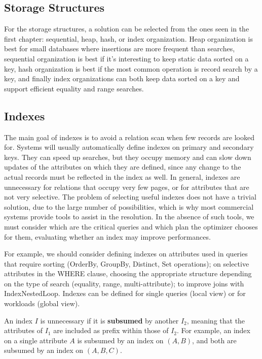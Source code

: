 \subsection{Storage Structures}

For the storage structures, a solution can be selected from the ones seen in the first chapter: sequential, heap, hash, or index organization. Heap organization is best for small databases where insertions are more frequent than searches, sequential organization is best if it's interesting to keep static data sorted on a key, hash organization is best if the most common operation is record search by a key, and finally index organizations can both keep data sorted on a key and support efficient equality and range searches.

\subsection{Indexes}
The main goal of indexes is to avoid a relation scan when few records are looked for. Systems will usually automatically define indexes on primary and secondary keys. They can speed up searches, but they occupy memory and can slow down updates of the attributes on which they are defined, since any change to the actual records must be reflected in the index as well. In general, indexes are unnecessary for relations that occupy very few pages, or for attributes that are not very selective. The problem of selecting useful indexes does not have a trivial solution, due to the large number of possibilities, which is why most commercial systems provide tools to assist in the resolution. In the absence of such tools, we must consider which are the critical queries and which plan the optimizer chooses for them, evaluating whether an index may improve performances.

For example, we should consider defining indexes on  attributes used in queries that require sorting (OrderBy, GroupBy, Distinct, Set operations); on selective attributes in the WHERE clause, choosing the appropriate structure depending on the type of search (equality, range, multi-attribute); to improve joins with IndexNestedLoop. Indexes can be defined for single queries (local view) or for workloads (global view).

An index $I$ is unnecessary if it is \textbf{subsumed} by another $I_2$, meaning that the attributes of $I_1$ are included as prefix within those of $I_2$. For example, an index on a single attribute $A$ is subsumed by an index on $(A, B)$, and both are subsumed by an index on $(A, B, C)$.

